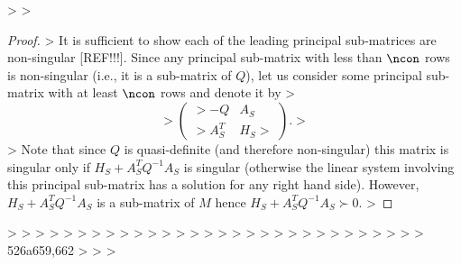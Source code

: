 > 
> \begin{proof}
> It is sufficient to show each of the leading principal sub-matrices are non-singular [REF!!!]. Since any principal sub-matrix with less than $\ncon$ rows is non-singular (i.e., it is a sub-matrix of $Q$), let us consider some principal sub-matrix with at least $\ncon$ rows and denote it by
> $$
> \left(\begin{matrix}
> -Q & A_{S}  \\
> A^T_{S} & H_{S}
> \end{matrix}\right).
> $$
> Note that since $Q$ is quasi-definite (and therefore non-singular) this matrix is singular only if $H_{S} + A^T_{S} Q^{-1} A_{S}$ is singular (otherwise the linear system involving this principal sub-matrix has a solution for any right hand side). However, $H_{S} + A^T_{S} Q^{-1} A_{S}$ is a sub-matrix of $M$ hence $H_{S} + A^T_{S} Q^{-1} A_{S} \succ 0$.
> \end{proof}
> 
> \fi
> 
> %
> 
> 
> 
> 
> %
> 
> 
> %
> %
> %
> %
> %
> %
> %
> %
> 
> 
> %
> 
> 
> %
> 
> %
> 
> %
> 
526a659,662
> 
> 
> %
